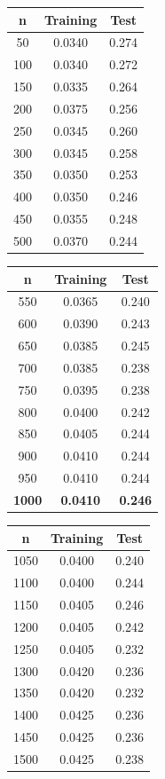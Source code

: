 \documentclass[10pt]{extarticle}
\begin{document}
\begin{minipage}{.25\textwidth}
	\begin{tabular}{c c c}
		n & Training & Test\\ \hline
		50&0.0340&0.274\\
		100&0.0340&0.272\\
		150&0.0335&0.264\\
		200&0.0375&0.256\\
		250&0.0345&0.260\\
		300&0.0345&0.258\\
		350&0.0350&0.253\\
		400&0.0350&0.246\\
		450&0.0355&0.248\\
		500&0.0370&0.244
	\end{tabular}
\end{minipage}
\begin{minipage}{.25\textwidth}
	\begin{tabular}{c c c}
		n & Training & Test\\ \hline
		550&0.0365&0.240\\
		600&0.0390&0.243\\
		650&0.0385&0.245\\
		700&0.0385&0.238\\
		750&0.0395&0.238\\
		800&0.0400&0.242\\
		850&0.0405&0.244\\
		900&0.0410&0.244\\
		950&0.0410&0.244\\
		\textbf{1000}&\textbf{0.0410}&\textbf{0.246}\\
	\end{tabular}
\end{minipage}
\begin{minipage}{.25\textwidth}
	\begin{tabular}{c c c}
		n & Training & Test\\ \hline
		1050&0.0400&0.240\\
		1100&0.0400&0.244\\
		1150&0.0405&0.246\\
		1200&0.0405&0.242\\
		1250&0.0405&0.232\\
		1300&0.0420&0.236\\
		1350&0.0420&0.232\\
		1400&0.0425&0.236\\
		1450&0.0425&0.236\\
		1500&0.0425&0.238	
	\end{tabular}
\end{minipage}
\end{document}
